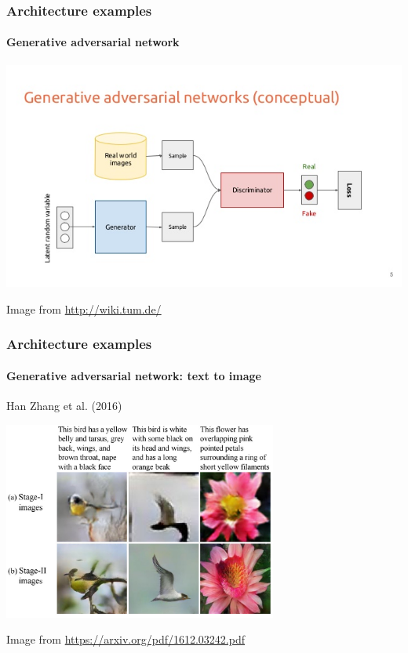 \documentclass[9pt]{beamer}
\begin{document}
\begin{frame}
  \frametitle{Architecture examples}

  \framesubtitle{Generative adversarial network}

  \begin{center}
    \includegraphics[width=\linewidth]{images/GAN_1.jpg}
  \end{center}

  {\small Image from \url{http://wiki.tum.de/}}
\end{frame}

\begin{frame}
  \frametitle{Architecture examples}

  \framesubtitle{Generative adversarial network: text to image}

  Han Zhang et al. (2016)

  \begin{center}
    \includegraphics[width=9cm]{images/GAN_2.jpg}
  \end{center}

  {\small Image from \url{https://arxiv.org/pdf/1612.03242.pdf}}
\end{frame}
\end{document}
